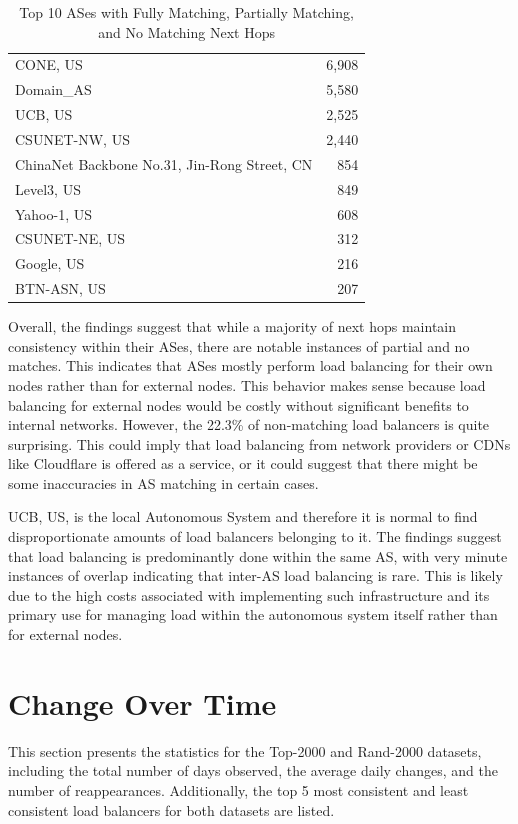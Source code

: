\documentclass[12pt]{cwru_thesis}
\begin{document}
\begin{table}[h!]
\begin{tabular}{|l|r|}
        \hline
        CONE, US & 6,908 \\
        Domain\_AS & 5,580 \\
        UCB, US & 2,525 \\
        CSUNET-NW, US & 2,440 \\
        ChinaNet Backbone No.31, Jin-Rong Street, CN & 854 \\
        Level3, US & 849 \\
        Yahoo-1, US & 608 \\
        CSUNET-NE, US & 312 \\
        Google, US & 216 \\
        BTN-ASN, US & 207 \\
        \hline
    \end{tabular}
    \caption{Top 10 ASes with Fully Matching, Partially Matching, and No Matching Next Hops}
    \label{tab:match_mismatch}
\end{table}

\newpage

Overall, the findings suggest that while a majority of next hops maintain consistency within their ASes, there are notable instances of partial and no matches. This indicates that ASes mostly perform load balancing for their own nodes rather than for external nodes. This behavior makes sense because load balancing for external nodes would be costly without significant benefits to internal networks. However, the 22.3\% of non-matching load balancers is quite surprising. This could imply that load balancing from network providers or CDNs like Cloudflare is offered as a service, or it could suggest that there might be some inaccuracies in AS matching in certain cases.

UCB, US, is the local Autonomous System and therefore it is normal to find disproportionate amounts of load balancers belonging to it. The findings suggest that load balancing is predominantly done within the same AS, with very minute instances of overlap indicating that inter-AS load balancing is rare. This is likely due to the high costs associated with implementing such infrastructure and its primary use for managing load within the autonomous system itself rather than for external nodes.


\section{Change Over Time}

This section presents the statistics for the Top-2000 and Rand-2000 datasets, including the total number of days observed, the average daily changes, and the number of reappearances. Additionally, the top 5 most consistent and least consistent load balancers for both datasets are listed.
\end{document}

